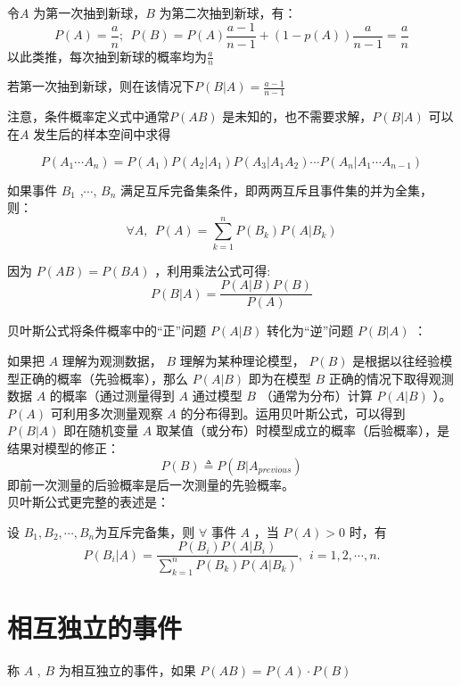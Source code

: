 \documentclass[11pt,fleqn]{book} %
\begin{document}
\begin{remark}
    令$ A $ 为第一次抽到新球，$ B $ 为第二次抽到新球，有：
    $$ P(A)=\frac{a}{n};~~P(B)=P(A)\frac{a-1}{n-1}+(1-p(A))\frac{a}{n-1}=\frac{a}{n} $$ 
    以此类推，每次抽到新球的概率均为$ \frac{a}{n} $ 

    若第一次抽到新球，则在该情况下$ P(B|A)=\frac{a-1}{n-1} $ 
\end{remark}
注意，条件概率定义式中通常$ P(AB) $ 是未知的，也不需要求解，$ P(B|A) $ 可以在$ A $ 发生后的样本空间中求得

\begin{corollary}[乘法公式]
    $$ P(A_1\cdots A_n)=P(A_1)P(A_2|A_1)P(A_3|A_1A_2)\cdots P(A_n|A_1\cdots A_{n-1}) $$ 
\end{corollary}

\begin{corollary}[全概率公式]
    如果事件 $ B_1 $ ,$ \cdots $, $ B_n $ 
    满足互斥完备集条件，即两两互斥且事件集的并为全集，则：
    $$ \forall A,~~P(A)=\sum\limits_{k=1}^{n} P(B_k)P(A|B_k) $$ 
\end{corollary}

\begin{corollary}[贝叶斯公式]
    因为 $ P(AB)=P(BA) $ ，利用乘法公式可得:
    $$ P(B|A)=\frac{P(A|B)P(B)}{P(A)} $$    
\end{corollary}
贝叶斯公式将条件概率中的“正”问题 $ P(A|B) $ 转化为“逆”问题 $ P(B|A) $ ：

如果把 $ A $ 理解为观测数据， $ B $ 理解为某种理论模型， $ P(B) $ 是根据以往经验模型正确的概率（先验概率），那么 $ P(A|B) $ 即为在模型 $ B $ 正确的情况下取得观测数据 $ A $ 的概率（通过测量得到 $ A $ 通过模型 $ B $ （通常为分布）计算 $ P(A|B) $ ）。 $ P(A) $ 可利用多次测量观察 $ A $ 的分布得到。运用贝叶斯公式，可以得到 $ P(B|A) $ 即在随机变量 $ A $ 取某值（或分布）时模型成立的概率（后验概率），是结果对模型的修正：
$$ P(B)\triangleq P(B|A_{previous}) $$
即前一次测量的后验概率是后一次测量的先验概率。
\\贝叶斯公式更完整的表述是：

设 $ B_1,B_2,\cdots,B_n $为互斥完备集，则 $ \forall $ 事件 $ A $ ，当 $ P(A)>0 $ 时，有
$$ P(B_i|A)=\frac{P(B_i)P(A|B_i)}{\sum\limits_{k=1}^{n}P(B_k)P(A|B_k) },~~i=1,2,\cdots,n. $$  

\section{相互独立的事件}
\begin{definition}[独立]
    称 $ A $ , $ B $ 为相互独立的事件，如果 $ P(AB)=P(A)\cdot P(B) $ 
\end{definition}
\end{document}
